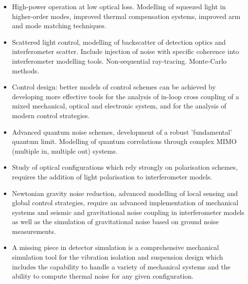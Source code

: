 \begin{itemize}
\item High-power operation at low optical loss.
Modelling of squeezed light in higher-order modes, improved thermal compensation systems, improved arm and mode matching techniques.
\item Scattered light control, modelling of backscatter of detection optics and interferometer scatter. Include injection of noise with specific coherence into interferometer modelling tools. Non-sequential ray-tracing. Monte-Carlo methods.
\item Control design: better models of control schemes can be achieved by developing more effective tools for the analysis of in-loop cross coupling of a mixed mechanical, optical and electronic system, and for the analysis of modern
control strategies.
\item Advanced quantum noise schemes, development of a robust 'fundamental' quantum limit. Modelling of quantum correlations through complex MIMO (multiple in, multiple out) systems.
\item Study of optical configurations which rely strongly on polarisation schemes, requires the addition of light polarisation to interferometer models.
\item Newtonian gravity noise reduction, advanced modelling of local sensing and global control strategies, require an advanced implementation of mechanical systems and seismic and gravitational noise coupling in interferometer models as well as the simulation of gravitational noise based on ground noise measurements.
\item A missing piece in detector simulation is a comprehensive mechanical simulation tool for the vibration isolation and suspension design which includes the capability to handle a variety of mechanical systems and the ability to compute thermal noise for any given configuration.
\end{itemize}

